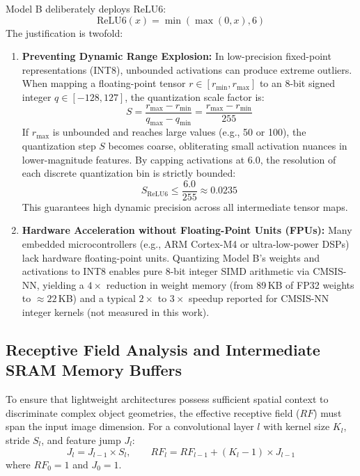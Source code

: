 \documentclass[11pt,a4paper]{article}
\begin{document}
Model B deliberately deploys $\text{ReLU6}$:
\begin{equation}
  \text{ReLU6}(x) = \min(\max(0, x), 6)
\end{equation}
The justification is twofold:
\begin{enumerate}[leftmargin=*,itemsep=2pt]
  \item \textbf{Preventing Dynamic Range Explosion:} In low-precision fixed-point representations (INT8), unbounded activations can produce extreme outliers. When mapping a floating-point tensor $r \in [r_{\min}, r_{\max}]$ to an 8-bit signed integer $q \in [-128, 127]$, the quantization scale factor is:
  \begin{equation}
    S = \frac{r_{\max} - r_{\min}}{q_{\max} - q_{\min}} = \frac{r_{\max} - r_{\min}}{255}
  \end{equation}
  If $r_{\max}$ is unbounded and reaches large values (e.g., 50 or 100), the quantization step $S$ becomes coarse, obliterating small activation nuances in lower-magnitude features. By capping activations at 6.0, the resolution of each discrete quantization bin is strictly bounded:
  \begin{equation}
    S_{\text{ReLU6}} \le \frac{6.0}{255} \approx 0.0235
  \end{equation}
  This guarantees high dynamic precision across all intermediate tensor maps.
  \item \textbf{Hardware Acceleration without Floating-Point Units (FPUs):} Many embedded microcontrollers (e.g., ARM Cortex-M4 or ultra-low-power DSPs) lack hardware floating-point units. Quantizing Model B's weights and activations to INT8 enables pure 8-bit integer SIMD arithmetic via CMSIS-NN, yielding a $4 \times$ reduction in weight memory (from 89\,KB of FP32 weights to $\approx 22$\,KB) and a typical $2 \times$ to $3 \times$ speedup reported for CMSIS-NN integer kernels (not measured in this work).
\end{enumerate}

\subsection{Receptive Field Analysis and Intermediate SRAM Memory Buffers}
To ensure that lightweight architectures possess sufficient spatial context to discriminate complex object geometries, the effective receptive field ($RF$) must span the input image dimension. For a convolutional layer $l$ with kernel size $K_l$, stride $S_l$, and feature jump $J_l$:
\begin{equation}
  J_l = J_{l-1} \times S_l, \qquad RF_l = RF_{l-1} + (K_l - 1) \times J_{l-1}
\end{equation}
where $RF_0 = 1$ and $J_0 = 1$.
\end{document}
